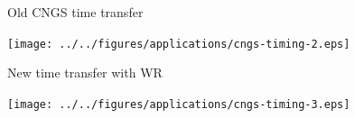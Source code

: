 \documentclass[compress,red]{beamer}
\begin{document}
\begin{frame}{Old CNGS time transfer}

      \begin{center}
      \texttt{[image: ../../figures/applications/cngs-timing-2.eps]}
      \end{center}

\end{frame}
\begin{frame}{New time transfer with WR}

      \begin{center}
      \texttt{[image: ../../figures/applications/cngs-timing-3.eps]}
      \end{center}

\end{frame}
\end{document}
